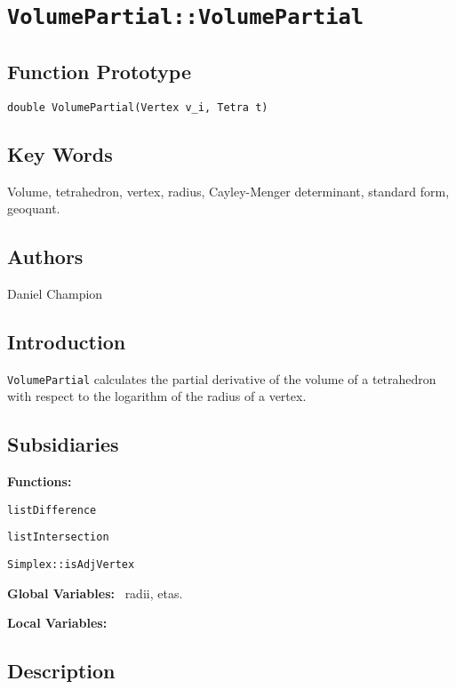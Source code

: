                       

\section*{\texttt{VolumePartial::VolumePartial}}

\subsection*{Function Prototype}

\texttt{double VolumePartial(Vertex v\_i, Tetra t)}

\subsection*{Key Words}

Volume, tetrahedron, vertex, radius, Cayley-Menger determinant, standard
form, geoquant.

\subsection*{Authors}

Daniel Champion

\subsection*{Introduction}

\texttt{VolumePartial} calculates the partial derivative of the volume of a
tetrahedron with respect to the logarithm of the radius of a vertex.

\subsection*{Subsidiaries}

\textbf{Functions:} \ 

\texttt{listDifference}

\texttt{listIntersection}

\texttt{Simplex::isAdjVertex}

\textbf{Global Variables:} \ radii, etas.

\textbf{Local Variables:}

\subsection*{Description}

